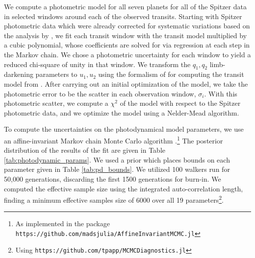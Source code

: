 \documentclass[fleqn,usenatbib]{mnras} %
\begin{document}
We compute a photometric model for all seven
planets for all of the Spitzer data in selected windows around each of the observed
transits.  Starting with Spitzer photometric data which were already corrected for systematic
variations based on the analysis by \citet{Ducrot2020}, we fit  each transit window
with the transit model multiplied by a cubic polynomial, whose coefficients are solved
for via regression at each step in the Markov chain.  We chose a photometric uncertainty
for each window to yield a reduced chi-square of unity in that  window.  We 
transform the $q_1, q_2$ limb-darkening 
parameters to $u_1,u_2$ using the formalism of \citet{Kipping2013} for computing the transit model from \citet{Agol2019}.  After carrying out an initial
optimization of the model, we take the photometric error to be the
scatter in each observation window, $\sigma_i$.  With this photometric
scatter, we compute a $\chi^2$ of the model with respect to the Spitzer
photometric data, and we optimize the model using a Nelder-Mead algorithm.

To compute the uncertainties on the photodynamical model parameters, we
use an affine-invariant Markov chain Monte Carlo algorithm \citep{Goodman2010}.\footnote{As
implemented in the package \texttt{https://github.com/madsjulia/AffineInvariantMCMC.jl}}
The posterior distribution of the results of the fit are given in Table \ref{tab:photodynamic_params}.
We used a prior which places bounds on
each parameter given in 
Table \ref{tab:pd_bounds}.
We utilized 100 walkers run for 50,000 generations, discarding the first 1500 generations 
for burn-in.  We computed the effective sample size using the integrated
auto-correlation length, finding a minimum effective samples size of 6000 over all 
19 parameters\footnote{Using \texttt{https://github.com/tpapp/MCMCDiagnostics.jl}}.
\end{document}
